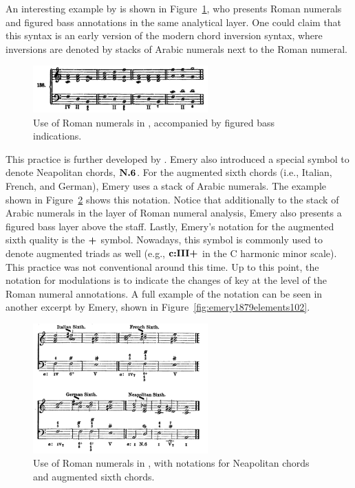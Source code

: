 An interesting example by \textcite{bussler1878praktische} is shown in Figure~\ref{fig:bussler1878praktische063}, who presents Roman numerals and figured bass annotations in the same analytical layer.
One could claim that this syntax is an early version of the modern chord inversion syntax, where inversions are denoted by stacks of Arabic numerals next to the Roman numeral.

\begin{figure}[h!]
    \centering
    \includegraphics[width=0.6\textwidth]{figures/chapter/2/primary_sources/bussler1878praktische063.png}
    \caption{Use of Roman numerals in \textcite{bussler1878praktische}, accompanied by figured bass indications.}
    \label{fig:bussler1878praktische063}
\end{figure}

This practice is further developed by \textcite{emery1879elements}.
Emery also introduced a special symbol to denote Neapolitan chords, $\textbf{N.6}\relax\relax$.
For the augmented sixth chords (i.e., Italian, French, and German), Emery uses a stack of Arabic numerals.
The example shown in Figure~\ref{fig:emery1879elements051} shows this notation. 
Notice that additionally to the stack of Arabic numerals in the layer of Roman numeral analysis, Emery also presents a figured bass layer above the staff.
Lastly, Emery's notation for the augmented sixth quality is the $\textbf{+}\relax\relax$ symbol.
Nowadays, this symbol is commonly used to denote augmented triads as well (e.g., $\textbf{c:III+}\relax\relax$ in the C harmonic minor scale).
This practice was not conventional around this time.
Up to this point, the notation for modulations is to indicate the changes of key at the level of the Roman numeral annotations. 
A full example of the notation can be seen in another excerpt by Emery, shown in Figure~\ref{fig:emery1879elements102}.

\begin{figure}[h!]
    \centering
    \includegraphics[width=0.6\textwidth]{figures/chapter/2/primary_sources/emery1879elements051.png}
    \caption{Use of Roman numerals in \textcite{emery1879elements}, with notations for Neapolitan chords and augmented sixth chords.}
    \label{fig:emery1879elements051}
\end{figure}

